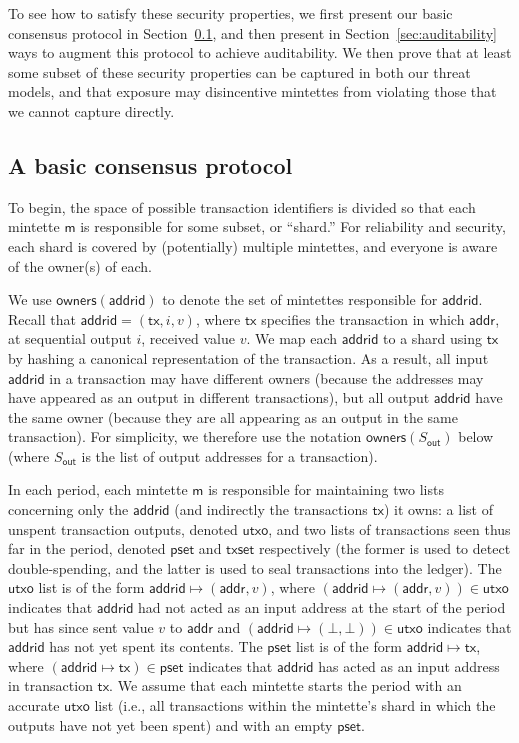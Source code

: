 \documentclass[conference]{IEEEtran}
\newcommand{\outputs}{\mathsf{out}}
\newcommand{\addr}{\mathsf{addr}}
\newcommand{\addrid}{\mathsf{addrid}}
\newcommand{\tx}{\mathsf{tx}}
\newcommand{\mintette}{\mathsf{m}}
\newcommand{\owners}{\mathsf{owners}}
\newcommand{\periodtxset}{\mathsf{pset}}
\newcommand{\txset}{\mathsf{txset}}
\newcommand{\utxo}{\mathsf{utxo}}
\begin{document}
To see how to satisfy these security properties, we first present our basic
consensus protocol in Section~\ref{sec:basic-consensus}, and then present in
Section~\ref{sec:auditability} ways to augment this protocol to achieve
auditability.  We then prove that at least some subset of these security
properties can be captured in both our threat models, and that exposure may
disincentive mintettes from violating those that we cannot capture directly.

\subsection{A basic consensus protocol}\label{sec:basic-consensus}

To begin, the space of possible transaction identifiers is divided
so that each mintette $\mintette$ is responsible for some subset,
or ``shard.''  For reliability and security, each shard is covered by
(potentially) multiple mintettes, and everyone is aware of the owner(s) of
each.

We use $\owners(\addrid)$ to denote the set of mintettes responsible for
$\addrid$.  Recall that $\addrid=(\tx,i,v)$, where $\tx$ specifies the
transaction in which $\addr$, at sequential output $i$, received value $v$. We
map each $\addrid$ to a shard using $\tx$
by hashing
a canonical representation of the transaction.  As a result, all input
$\addrid$ in a transaction
may have different owners (because the addresses may have appeared as an
output
in different transactions), but all output $\addrid$ have the same owner
(because they are all appearing as an output in the same transaction).  For
simplicity, we therefore use the notation $\owners(S_\outputs)$ below
(where $S_\outputs$ is the list of output addresses for a transaction).

In each period, each mintette $\mintette$ is responsible for maintaining two
lists concerning only the $\addrid$ (and indirectly the transactions $\tx$) it
owns: a list of unspent transaction outputs, denoted $\utxo$, and two lists of
transactions seen thus far in the period, denoted $\periodtxset$ and $\txset$
respectively (the former is used to detect double-spending, and the latter is
used to seal transactions into the ledger).  The $\utxo$
list is of the form $\addrid\mapsto(\addr,v)$, where
$(\addrid\mapsto(\addr,v))\in\utxo$ indicates that $\addrid$ had not acted as
an
input address at the start of the period but has since sent value $v$ to
$\addr$
and $(\addrid\mapsto(\bot,\bot))\in\utxo$ indicates that $\addrid$ has not yet
spent its
contents.  The $\periodtxset$ list is of the form $\addrid\mapsto\tx$, where
$(\addrid\mapsto\tx)\in\periodtxset$ indicates that $\addrid$ has acted as an
input address in transaction $\tx$.  We assume
that each mintette starts the period with an accurate $\utxo$ list (i.e.,
all transactions within the mintette's shard in which the outputs have not yet
been spent) and with an empty $\periodtxset$.
\end{document}
